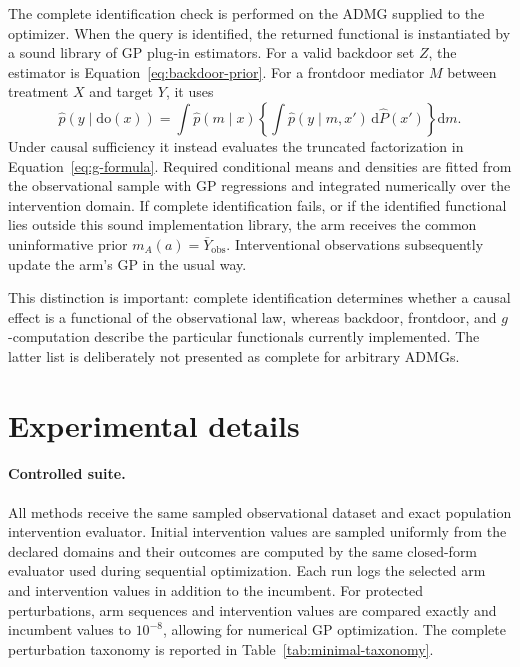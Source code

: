 \documentclass[twoside]{article}
\newcommand{\doo}{\mathrm{do}}
\begin{document}
The complete identification check is performed on the ADMG supplied to the
optimizer. When the query is identified, the returned functional is
instantiated by a sound library of GP plug-in estimators. For a valid
backdoor set $Z$, the estimator is Equation~\eqref{eq:backdoor-prior}. For a
frontdoor mediator $M$ between treatment $X$ and target $Y$, it uses
\begin{equation}
 \widehat p(y\mid\doo(x))=
 \int \widehat p(m\mid x)
 \left\{\int \widehat p(y\mid m,x')\,\mathrm d\widehat P(x')\right\}
 \mathrm dm.
 \label{eq:frontdoor-estimator}
\end{equation}
Under causal sufficiency it instead evaluates the truncated factorization
in Equation~\eqref{eq:g-formula}. Required conditional means and densities
are fitted from the observational sample with GP regressions and integrated
numerically over the intervention domain. If complete identification fails,
or if the identified functional lies outside this sound implementation
library, the arm receives the common uninformative prior
$m_A(a)=\bar Y_{\mathrm{obs}}$. Interventional observations subsequently
update the arm's GP in the usual way.

This distinction is important: complete identification determines whether a
causal effect is a functional of the observational law, whereas backdoor,
frontdoor, and $g$-computation describe the particular functionals currently
implemented. The latter list is deliberately not presented as complete for
arbitrary ADMGs.

\section{Experimental details}
\label{app:additional-results}

\paragraph{Controlled suite.}
All methods receive the same sampled observational dataset and exact
population intervention evaluator. Initial intervention values are sampled
uniformly from the declared domains and their outcomes are computed by the
same closed-form evaluator used during sequential optimization. Each run
logs the selected arm and intervention values in addition to the incumbent.
For protected perturbations, arm sequences and intervention values are
compared exactly and incumbent values to $10^{-8}$, allowing for numerical
GP optimization. The complete perturbation taxonomy is reported in
Table~\ref{tab:minimal-taxonomy}.
\end{document}
